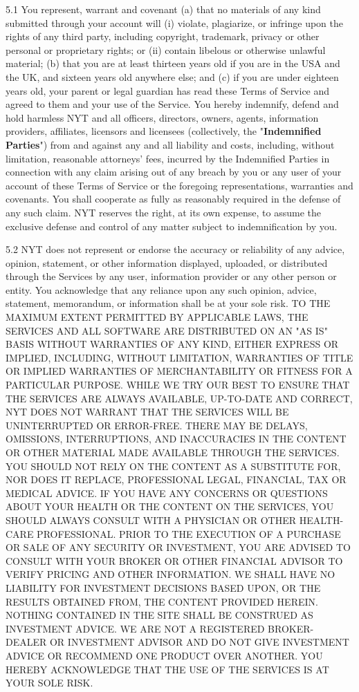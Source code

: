 5.1 You represent, warrant and covenant (a) that no materials of any
kind submitted through your account will (i) violate, plagiarize, or
infringe upon the rights of any third party, including copyright,
trademark, privacy or other personal or proprietary rights; or (ii)
contain libelous or otherwise unlawful material; (b) that you are at
least thirteen years old if you are in the USA and the UK, and sixteen
years old anywhere else; and (c) if you are under eighteen years old,
your parent or legal guardian has read these Terms of Service and agreed
to them and your use of the Service. You hereby indemnify, defend and
hold harmless NYT and all officers, directors, owners, agents,
information providers, affiliates, licensors and licensees
(collectively, the "\textbf{Indemnified Parties}") from and against any
and all liability and costs, including, without limitation, reasonable
attorneys' fees, incurred by the Indemnified Parties in connection with
any claim arising out of any breach by you or any user of your account
of these Terms of Service or the foregoing representations, warranties
and covenants. You shall cooperate as fully as reasonably required in
the defense of any such claim. NYT reserves the right, at its own
expense, to assume the exclusive defense and control of any matter
subject to indemnification by you.

5.2 NYT does not represent or endorse the accuracy or reliability of any
advice, opinion, statement, or other information displayed, uploaded, or
distributed through the Services by any user, information provider or
any other person or entity. You acknowledge that any reliance upon any
such opinion, advice, statement, memorandum, or information shall be at
your sole risk. TO THE MAXIMUM EXTENT PERMITTED BY APPLICABLE LAWS, THE
SERVICES AND ALL SOFTWARE ARE DISTRIBUTED ON AN "AS IS" BASIS WITHOUT
WARRANTIES OF ANY KIND, EITHER EXPRESS OR IMPLIED, INCLUDING, WITHOUT
LIMITATION, WARRANTIES OF TITLE OR IMPLIED WARRANTIES OF MERCHANTABILITY
OR FITNESS FOR A PARTICULAR PURPOSE. WHILE WE TRY OUR BEST TO ENSURE
THAT THE SERVICES ARE ALWAYS AVAILABLE, UP-TO-DATE AND CORRECT, NYT DOES
NOT WARRANT THAT THE SERVICES WILL BE UNINTERRUPTED OR ERROR-FREE. THERE
MAY BE DELAYS, OMISSIONS, INTERRUPTIONS, AND INACCURACIES IN THE CONTENT
OR OTHER MATERIAL MADE AVAILABLE THROUGH THE SERVICES. YOU SHOULD NOT
RELY ON THE CONTENT AS A SUBSTITUTE FOR, NOR DOES IT REPLACE,
PROFESSIONAL LEGAL, FINANCIAL, TAX OR MEDICAL ADVICE. IF YOU HAVE ANY
CONCERNS OR QUESTIONS ABOUT YOUR HEALTH OR THE CONTENT ON THE SERVICES,
YOU SHOULD ALWAYS CONSULT WITH A PHYSICIAN OR OTHER HEALTH-CARE
PROFESSIONAL. PRIOR TO THE EXECUTION OF A PURCHASE OR SALE OF ANY
SECURITY OR INVESTMENT, YOU ARE ADVISED TO CONSULT WITH YOUR BROKER OR
OTHER FINANCIAL ADVISOR TO VERIFY PRICING AND OTHER INFORMATION. WE
SHALL HAVE NO LIABILITY FOR INVESTMENT DECISIONS BASED UPON, OR THE
RESULTS OBTAINED FROM, THE CONTENT PROVIDED HEREIN. NOTHING CONTAINED IN
THE SITE SHALL BE CONSTRUED AS INVESTMENT ADVICE. WE ARE NOT A
REGISTERED BROKER-DEALER OR INVESTMENT ADVISOR AND DO NOT GIVE
INVESTMENT ADVICE OR RECOMMEND ONE PRODUCT OVER ANOTHER. YOU HEREBY
ACKNOWLEDGE THAT THE USE OF THE SERVICES IS AT YOUR SOLE RISK.

